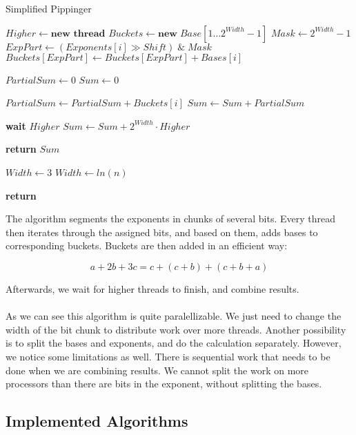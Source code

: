 \begin{algorithm}
\caption{Simplified Pippinger}\label{multiexp}
\begin{algorithmic}[1]

        \State $Higher \gets \textbf{new thread}$ 
    \EndIf
    \State $Buckets \gets \textbf{new} \; Base[1\dots2^{Width}-1]$
    \State $Mask \gets 2^{Width}-1$
        \State $ExpPart \gets (Exponents[i] \gg Shift) \; \&  \;Mask$
            \State $Buckets[ExpPart] \gets Buckets[ExpPart] + Bases[i]$
        \EndIf
    \EndFor
    
    \State $PartialSum \gets 0$
    \State $Sum \gets 0$
    
        \State $PartialSum \gets PartialSum + Buckets[i]$
        \State $Sum \gets Sum + PartialSum$
    \EndFor
    
        \State \textbf{wait} $Higher$
        \State $Sum \gets Sum + 2^{Width} \cdot Higher$ 
    \EndIf
    
    \State \textbf{return} $Sum$
\EndFunction

        \State $Width \gets 3$
    \Else
        \State $Width \gets ln(n)$
    \EndIf

    \State \textbf{return} 
    
\EndFunction
\end{algorithmic}
\end{algorithm}

The algorithm segments the exponents in chunks of several bits. Every thread then iterates through the assigned bits, and based on them, adds bases to corresponding buckets. Buckets are then added in an efficient way:

$$ a + 2b + 3c = c + (c + b) + (c + b + a) $$

Afterwards, we wait for higher threads to finish, and combine results.\\
\\
As we can see this algorithm is quite paralellizable. We just need to change the width of the bit chunk to distribute work over more threads. Another possibility is to split the bases and exponents, and do the calculation separately. However, we notice some limitations as well. There is sequential work that needs to be done when we are combining results. We cannot split the work on more processors than there are bits in the exponent, without splitting the bases.
\\
\subsection{Implemented Algorithms}
